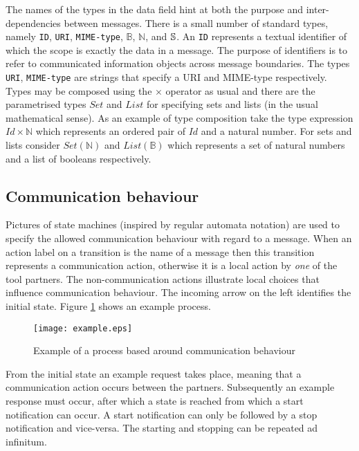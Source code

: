 \documentclass{article}
\newcommand{\String}{\ensuremath \mathbb{S}\xspace}
\newcommand{\Id}{\texttt{ID}\xspace}
\newcommand{\URI}{\texttt{URI}\xspace}
\newcommand{\MIMEtype}{\texttt{MIME-type}\xspace}
\begin{document}
   The names of the types in the data field hint at both the purpose and
   inter-dependencies between messages. There is a small number of standard
   types, namely \Id, \URI, \MIMEtype, $\mathbb{B}$, $\mathbb{N}$, and $\String$.
   An \Id represents a textual identifier of which the scope is exactly the
   data in a message. The purpose of identifiers is to refer to communicated
   information objects across message boundaries. The types \URI, \MIMEtype are
   strings that specify a URI \cite{rfc3305} and MIME-type \cite{rfc2045}
   respectively.  Types may be composed using the $\times$ operator as usual
   and there are the parametrised types $Set$ and $List$ for specifying sets
   and lists (in the usual mathematical sense). As an example of type
   composition take the type expression $\textit{Id} \times \mathbb{N}$ which
   represents an ordered pair of $\textit{Id}$ and a natural number. For sets
   and lists consider $Set(\mathbb{N})$ and $List(\mathbb{B})$ which represents
   a set of natural numbers and a list of booleans respectively.

  \subsection{Communication behaviour}
   
   Pictures of state machines (inspired by regular automata notation)
   are used to specify the allowed communication behaviour with regard to a
   message. When an action label on a transition is the name of a message then
   this transition represents a communication action, otherwise it is a local
   action by \emph{one} of the tool partners. The non-communication actions
   illustrate local choices that influence communication behaviour. The
   incoming arrow on the left identifies the initial state. Figure
   \ref{figure:process_example} shows an example process.

   \begin{figure}[H]
    \begin{center}
     \texttt{[image: example.eps]}
    \end{center}
    \vspace{-0.3cm}
    \caption{Example of a process based around communication behaviour}
    \label{figure:process_example}
   \end{figure}

   From the initial state an example request takes place, meaning that a
   communication action occurs between the partners. Subsequently an example
   response must occur, after which a state is reached from which a start
   notification can occur. A start notification can only be followed by a stop
   notification and vice-versa. The starting and stopping can be repeated ad
   infinitum.
\end{document}
